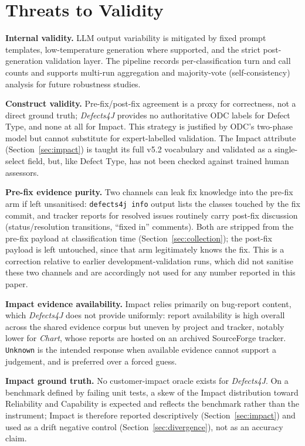 \section{Threats to Validity}
\label{sec:threats}

\noindent\textbf{Internal validity.}\quad
LLM output variability is mitigated by fixed prompt templates, low-temperature
generation where supported, and the strict post-generation validation layer. The
pipeline records per-classification turn and call counts and supports multi-run
aggregation and majority-vote (self-consistency) analysis for future robustness
studies.

\smallskip
\noindent\textbf{Construct validity.}\quad
Pre-fix/post-fix agreement is a proxy for correctness, not a direct ground
truth; \textit{Defects4J} provides no authoritative ODC labels for Defect Type,
and none at all for Impact. This strategy is justified by ODC's two-phase model
but cannot substitute for expert-labelled validation. The Impact attribute
(Section~\ref{sec:impact}) is taught its full v5.2 vocabulary and validated as
a single-select field, but, like Defect Type, has not been checked
against trained human assessors.

\smallskip
\noindent\textbf{Pre-fix evidence purity.}\quad
Two channels can leak fix knowledge into the pre-fix arm if left unsanitised:
\texttt{defects4j info} output lists the classes touched by the fix commit,
and tracker reports for resolved issues routinely carry post-fix discussion
(status/resolution transitions, ``fixed in'' comments). Both are stripped from
the pre-fix payload at classification time (Section~\ref{sec:collection}); the
post-fix payload is left untouched, since that arm legitimately knows the fix.
This is a correction relative to earlier development-validation runs, which did
not sanitise these two channels and are accordingly not used for any number
reported in this paper.

\smallskip
\noindent\textbf{Impact evidence availability.}\quad
Impact relies primarily on bug-report content, which \textit{Defects4J} does
not provide uniformly: report availability is high overall across the shared
evidence corpus but uneven by project and tracker, notably lower for
\textit{Chart}, whose reports are hosted on an archived SourceForge tracker.
\texttt{Unknown} is the intended response when available evidence cannot
support a judgement, and is preferred over a forced guess.

\smallskip
\noindent\textbf{Impact ground truth.}\quad
No customer-impact oracle exists for \textit{Defects4J}. On a benchmark
defined by failing unit tests, a skew of the Impact distribution toward
Reliability and Capability is expected and reflects the benchmark rather than
the instrument; Impact is therefore reported descriptively
(Section~\ref{sec:impact}) and used as a drift negative control
(Section~\ref{sec:divergence}), not as an accuracy claim.

